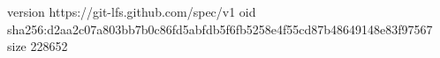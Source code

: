 version https://git-lfs.github.com/spec/v1
oid sha256:d2aa2c07a803bb7b0c86fd5abfdb5f6fb5258e4f55cd87b48649148e83f97567
size 228652
